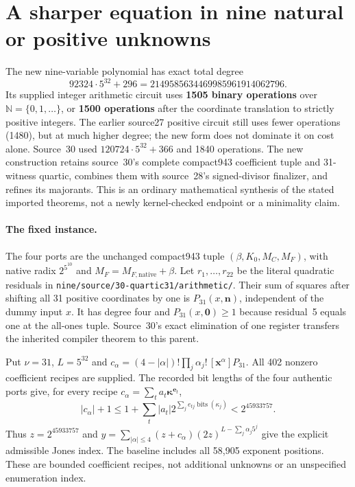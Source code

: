 \section{A sharper equation in nine natural or positive unknowns}
\label{sec:nine-completed-square}

The new nine-variable polynomial has exact total degree
\[
 \boxed{92324\cdot5^{32}+296
       =2149585634469985961914062796.}
\]
Its supplied integer arithmetic circuit uses \textbf{1505 binary operations}
 over $\mathbb N=\{0,1,\ldots\}$, or \textbf{1500 operations} after the
coordinate translation to strictly positive integers.  The earlier source27 positive circuit still uses fewer operations (1480), but at much higher degree; the new form does not dominate it on cost alone. Source~30 used
$120724\cdot5^{32}+366$ and 1840 operations.  The new construction retains
source~30's complete compact943 coefficient tuple and 31-witness quartic,
combines them with source~28's signed-divisor finalizer, and refines its
majorants.  This is an ordinary mathematical synthesis of the stated
imported theorems, not a newly kernel-checked endpoint or a minimality claim.

\paragraph{The fixed instance.}
The four ports are the unchanged compact943 tuple
$(\beta,K_0,M_C,M_F)$, with native radix $2^{5^{10}}$ and
$M_F=M_{F,\mathrm{native}}+\beta$.  Let $r_1,\ldots,r_{22}$ be the
literal quadratic residuals in \texttt{nine/source/30-quartic31/arithmetic/}.
Their sum of squares after shifting all 31 positive coordinates by one is
$P_{31}(x,\mathbf n)$, independent of the dummy input $x$.
It has degree four and $P_{31}(x,\mathbf0)\ge1$ because residual~5 equals
one at the all-ones tuple.  Source~30's exact elimination of one register
transfers the inherited compiler theorem to this parent.

Put $\nu=31$, $L=5^{32}$ and
$c_\alpha=(4-|\alpha|)!\prod_j\alpha_j!\,[\mathbf x^\alpha]P_{31}$.
All 402 nonzero coefficient recipes are supplied.  The recorded bit lengths
of the four authentic ports give, for every recipe
$c_\alpha=\sum_t a_t\boldsymbol\kappa^{\mathbf e_t}$,
\[
 |c_\alpha|+1\le
 1+\sum_t|a_t|2^{\sum_j e_{tj}\operatorname{bits}(\kappa_j)}
 <2^{45933757}.
\]
Thus $z=2^{45933757}$ and
$y=\sum_{|\alpha|\le4}(z+c_\alpha)(2z)^{L-\sum_j\alpha_j5^j}$
give the explicit admissible Jones index.  The baseline includes all
58,905 exponent positions.  These are bounded coefficient recipes, not
additional unknowns or an unspecified enumeration index.

